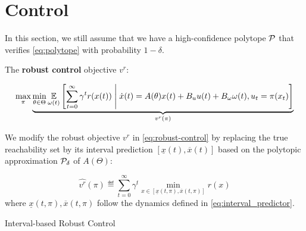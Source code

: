 \documentclass{article}
\begin{document}
\section{Control}

In this section, we still assume that we have a high-confidence polytope $\mathcal{P}$ that verifies \eqref{eq:polytope} with probability $1-\delta$.


The \textbf{robust control} objective $v^r$:

\begin{equation}
\label{eq:robust-control}
\max_\pi \underbrace{\min_{\theta \in \Theta} \operatorname*{\mathbb{E}}\limits_{\omega(t)}\left[\sum_{t=0}^\infty \gamma^t r(x(t))\;\middle|\; \dot{x}(t) = A(\theta) x(t) + B_u u(t) + B_\omega\omega(t), u_t = \pi(x_t)\right]}_{v^r(\pi)}
\end{equation}


\begin{definition}
We modify the robust objective $v^r$ in \eqref{eq:robust-control} by replacing the true reachability set by its interval prediction $[\underline{x}(t), \overline{x}(t)]$ based on the polytopic approximation $\mathcal{P}_\delta$ of $A(\Theta)$: 

\begin{equation}
\hat{v^r}(\pi) \eqdef \sum_{t=0}^\infty \gamma^t \min_{x\in[\underline{x}(t, \pi), \overline{x}(t, \pi)]}  r(x)
\end{equation}
where $\underline{x}(t, \pi), \overline{x}(t, \pi)$ follow the dynamics defined in \eqref{eq:interval_predictor}.
\end{definition}

\begin{algorithm}[tp]
  \SetAlgoLined\DontPrintSemicolon
  \setcounter{AlgoLine}{0}
\caption{Interval-based Robust Control}
\label{algo:irc}

\end{algorithm}
\end{document}
